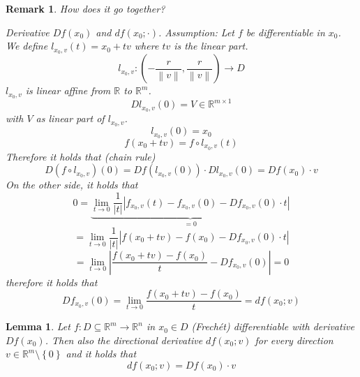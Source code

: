 \documentclass{article}
\newtheorem{lemma}{Lemma}  \numberwithin{lemma}{section}
\newtheorem{remark}{Remark}  \numberwithin{remark}{section}
\newcommand{\set}[1]{\left\{#1\right\}}
\newcommand{\norm}[1]{\left\|#1\right\|}
\newcommand{\card}[1]{\left|#1\right|}
\begin{document}
\begin{remark}
  How does it go together?
  
  Derivative $Df(x_0)$ and $df(x_0; \cdot)$.
  Assumption: Let $f$ be differentiable in $x_0$.
  We define $l_{x_0,v}(t) = x_0 + tv$
  where $tv$ is the linear part.
  \[ l_{x_0,v}: \left(-\frac{r}{\norm{v}}, \frac{r}{\norm{v}}\right) \to D \]
  $l_{x_0,v}$ is linear affine from $\mathbb R$ to $\mathbb R^m$.
  \[ Dl_{x_0,v}(0) = V \in \mathbb R^{m \times 1} \]
  with $V$ as linear part of $l_{x_0,v}$.
  \[ l_{x_0, v}(0) = x_0 \]
  \[ f(x_0 + tv) = f \circ l_{x_0,v}(t) \]
  Therefore it holds that (chain rule)
  \[ D(f \circ l_{x_0,v})(0) = Df(l_{x_0,v}(0)) \cdot Dl_{x_0,v}(0) = Df(x_0) \cdot v \]
  On the other side, it holds that
  \[ 0 = \underbrace{\lim_{t\to 0} \frac{1}{\card{t}} \card{f_{x_0,v}(t) - f_{x_0,v}(0) - Df_{x_0,v}(0) \cdot t}}_{=0} \]
  \[ = \lim_{t\to0} \frac{1}{\card{t}} \card{f(x_0 + tv) - f(x_0) - Df_{x_0,v}(0) \cdot t} \]
  \[ = \lim_{t\to0} \card{\frac{f(x_0 + tv) - f(x_0)}{t} - Df_{x_0,v}(0)} = 0 \]
  therefore it holds that
  \[ Df_{x_0,v}(0) = \lim_{t\to 0} \frac{f(x_0 + tv) - f(x_0)}{t} = df(x_0;v) \]
\end{remark}

\begin{lemma} %
  Let $f: D \subseteq \mathbb R^m \to \mathbb R^n$ in $x_0 \in D$ (Frech\'et) differentiable with derivative $Df(x_0)$.
  Then also the directional derivative $df(x_0; v)$ for every direction $v \in \mathbb R^m \setminus \set{0}$ and it holds that
  \[ df(x_0; v) = Df(x_0) \cdot v \]
\end{lemma}
\end{document}

